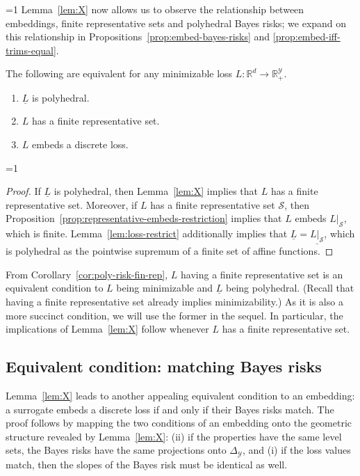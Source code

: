 \documentclass[twoside,11pt]{article}
\newcommand{\CommentsR}{1}
\newcommand{\reviewerresponse}[2]{\ifnum\CommentsR=1%
  \todo[linecolor=#1!80!black,backgroundcolor=#1,bordercolor=#1!80!black]{#2}\fi}
\newcommand{\reviewertwo}[1]{\reviewerresponse{blue!20!white}{R2: #1}}
\newcommand{\reals}{\mathbb{R}}
\newcommand{\simplex}{\Delta_\Y}
\newcommand{\Sc}{\mathcal{S}}
\newcommand{\Y}{\mathcal{Y}}
\newcommand{\risk}[1]{\underline{#1}}
\begin{document}
\reviewertwo{Forward ref}
Lemma~\ref{lem:X} now allows us to observe the relationship between embeddings, finite representative sets and polyhedral Bayes risks; we expand on this relationship in Propositions~\ref{prop:embed-bayes-risks} and \ref{prop:embed-iff-trims-equal}.
\begin{corollary}\label{cor:poly-risk-fin-rep}
  The following are equivalent for any minimizable loss $L:\reals^d\to\reals^\Y_+$.
  \begin{enumerate}
  \item $\risk{L}$ is polyhedral.
  \item $L$ has a finite representative set.
  \item $L$ embeds a discrete loss.
  \end{enumerate}
\end{corollary}
\reviewertwo{Comment x}
\begin{proof}
	If $\risk L$ is polyhedral, then Lemma~\ref{lem:X} implies that $L$ has a finite representative set.
	Moreover, if $L$ has a finite representative set $\Sc$, then Proposition~\ref{prop:representative-embeds-restriction} implies that $L$ embeds $L|_{\Sc}$, which is finite.
	Lemma~\ref{lem:loss-restrict} additionally implies that $\risk L = \risk{L|_{\Sc}}$, which is polyhedral as the pointwise supremum of a finite set of affine functions.
\end{proof}

From Corollary~\ref{cor:poly-risk-fin-rep}, $L$ having a finite representative set is an equivalent condition to $L$ being minimizable and $\risk{L}$ being polyhedral.
(Recall that having a finite representative set already implies minimizability.)
As it is also a more succinct condition, we will use the former in the sequel.
In particular, the implications of Lemma~\ref{lem:X} follow whenever $L$ has a finite representative set.


\subsection{Equivalent condition: matching Bayes risks}\label{subsec:match-BR}


Lemma~\ref{lem:X} leads to another appealing equivalent condition to an embedding: a surrogate embeds a discrete loss if and only if their Bayes risks match.
The proof follows by mapping the two conditions of an embedding onto the geometric structure revealed by Lemma~\ref{lem:X}: (ii) if the properties have the same level sets, the Bayes risks have the same projections onto $\simplex$, and (i) if the loss values match, then the slopes of the Bayes risk must be identical as well.
\end{document}
